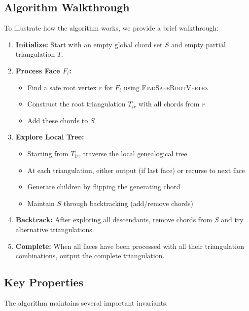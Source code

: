 \documentclass[12pt,a4paper]{article}
\theoremstyle{definition}
\theoremstyle{remark}
\begin{document}
\subsection{Algorithm Walkthrough}

To illustrate how the algorithm works, we provide a brief walkthrough:

\begin{enumerate}
    \item \textbf{Initialize:} Start with an empty global chord set $S$ and empty partial triangulation $T$.
    
    \item \textbf{Process Face $F_i$:} 
    \begin{itemize}
        \item Find a safe root vertex $r$ for $F_i$ using \textsc{FindSafeRootVertex}
        \item Construct the root triangulation $T_{ir}$ with all chords from $r$
        \item Add these chords to $S$
    \end{itemize}
    
    \item \textbf{Explore Local Tree:}
    \begin{itemize}
        \item Starting from $T_{ir}$, traverse the local genealogical tree
        \item At each triangulation, either output (if last face) or recurse to next face
        \item Generate children by flipping the generating chord
        \item Maintain $S$ through backtracking (add/remove chords)
    \end{itemize}
    
    \item \textbf{Backtrack:} After exploring all descendants, remove chords from $S$ and try alternative triangulations.
    
    \item \textbf{Complete:} When all faces have been processed with all their triangulation combinations, output the complete triangulation.
\end{enumerate}

\subsection{Key Properties}

The algorithm maintains several important invariants:
\end{document}
